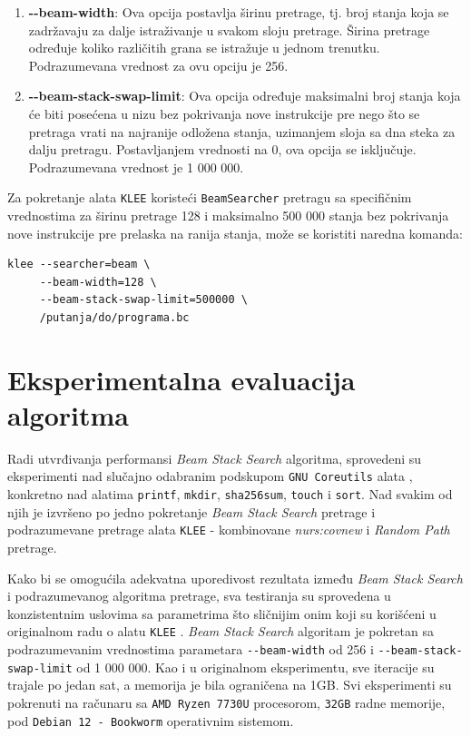 \documentclass[a4paper]{article}
\begin{document}
\begin{enumerate}
    \item \textbf{{-}{-}beam-width}: Ova opcija postavlja širinu pretrage, tj. broj stanja koja se zadržavaju za dalje istraživanje u svakom sloju pretrage. Širina pretrage određuje koliko različitih grana se istražuje u jednom trenutku. Podrazumevana vrednost za ovu opciju je 256.
    \item \textbf{{-}{-}beam-stack-swap-limit}: Ova opcija određuje maksimalni broj stanja koja će biti posećena u nizu bez pokrivanja nove instrukcije pre nego što se pretraga vrati na najranije odložena stanja, uzimanjem sloja sa dna steka za dalju pretragu. Postavljanjem vrednosti na 0, ova opcija se isključuje. Podrazumevana vrednost je 1 000 000.
\end{enumerate}

Za pokretanje alata \verb|KLEE| koristeći \verb|BeamSearcher| pretragu sa specifičnim vrednostima za širinu pretrage 128 i maksimalno 500 000 stanja bez pokrivanja nove instrukcije pre prelaska na ranija stanja, može se koristiti naredna komanda:

\begin{verbatim}
klee --searcher=beam \
     --beam-width=128 \
     --beam-stack-swap-limit=500000 \
     /putanja/do/programa.bc
\end{verbatim}

\section{Eksperimentalna evaluacija algoritma}

Radi utvrđivanja performansi \textit{Beam Stack Search} algoritma, sprovedeni su eksperimenti nad slučajno odabranim podskupom \verb|GNU Coreutils| alata \cite{GNUCoreutils}, konkretno nad alatima \verb|printf|, \verb|mkdir|, \verb|sha256sum|, \verb|touch| i \verb|sort|. Nad svakim od njih je izvršeno po jedno pokretanje \textit{Beam Stack Search} pretrage i podrazumevane pretrage alata \verb|KLEE| - kombinovane \textit{nurs:covnew} i \textit{Random Path} pretrage.

Kako bi se omogućila adekvatna uporedivost rezultata između \textit{Beam Stack Search} i podrazumevanog algoritma pretrage, sva testiranja su sprovedena u konzistentnim uslovima sa parametrima što sličnijim onim koji su korišćeni u originalnom radu o alatu \verb|KLEE| \cite{KLEE-paper-10.5555/1855741.1855756, KLEEExperiments}. \textit{Beam Stack Search} algoritam je pokretan sa podrazumevanim vrednostima parametara \verb|--beam-width| od 256 i \verb|--beam-stack-swap-limit| od 1 000 000. Kao i u originalnom eksperimentu, sve iteracije su trajale po jedan sat, a memorija je bila ograničena na 1GB. Svi eksperimenti su pokrenuti na računaru sa \verb|AMD Ryzen 7730U| procesorom, \verb|32GB| radne memorije, pod \verb|Debian 12 - Bookworm| operativnim sistemom.
\end{document}
